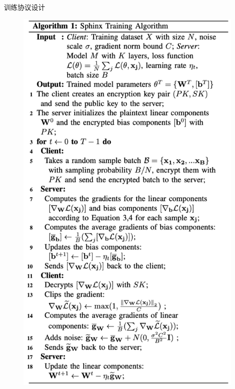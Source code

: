 \documentclass{beamer}
\begin{document}
\begin{frame}{训练协议设计}
\begin{minipage}{0.2\linewidth}
\begin{figure}[h]
            \includegraphics[height=.8\textheight]{pic/algorithm1.png}
        \end{figure} 
    \end{minipage}
\end{frame}
\end{document}
